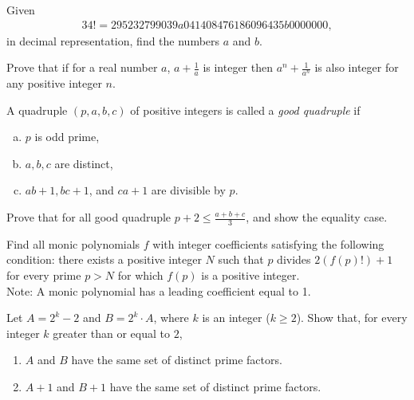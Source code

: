 \documentclass[problems.tex]{subfile}
\begin{document}
	\begin{problem}
		Given
		\begin{align*}
			34!=295232799039a041408476186096435b0000000,
		\end{align*}
		in decimal representation, find the numbers $a$ and $b$. %
	\end{problem}

	\begin{problem}
		Prove that if for a real number $a $, $a+\frac {1}{a} $ is integer then $a^n+\frac {1}{a^n} $ is also integer for any positive integer $n$. %
	\end{problem}

	\begin{problem}
		A quadruple $(p,a,b,c)$ of positive integers is called a \textit{good quadruple} if
		\begin{enumerate}[(a)]
			\item $p $ is odd prime,
			\item $a,b,c $ are distinct,
			\item $ab+1,bc+1$, and $ca+1$ are divisible by $p$.
		\end{enumerate}
		Prove that for all good quadruple $p+2\le \frac {a+b+c}{3} $, and show the equality case. %
	\end{problem}

	\begin{problem}[Balkan 2016]
		Find all monic polynomials $f$ with integer coefficients satisfying the following condition: there exists a positive integer $N$ such that $p$ divides $2(f(p)!)+1$ for every prime $p>N$ for which $f(p)$ is a positive integer.
		\\
		Note: A monic polynomial has a leading coefficient equal to 1. %
	\end{problem}

	\begin{problem}
		Let $A=2^k - 2$ and $B= 2^k \cdot A$, where $k$ is an integer ($k \ge 2$).
		Show that, for every integer $k$ greater than or equal to $2$,
		\begin{enumerate}
			\item $A$ and $B$ have the same set of distinct prime factors.
			\item $A+1$ and $B+1$ have the same set of distinct prime factors.
		\end{enumerate}
	\end{problem}
\end{document}
